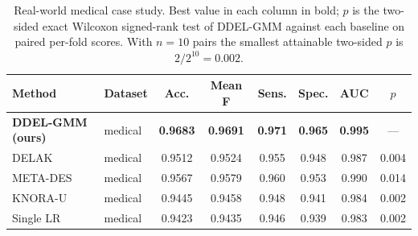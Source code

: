\begin{table}[htbp]
	\begin{center}
		\caption{Real-world medical case study. Best value in each column in bold; $p$ is the two-sided exact Wilcoxon signed-rank test of DDEL-GMM against each baseline on paired per-fold scores. With $n=10$ pairs the smallest attainable two-sided $p$ is $2/2^{10}=0.002$.}
		\label{tab:case_study}
		\begin{tabular}{|l|l|c|c|c|c|c|c|}
			\hline
			\textbf{Method} & \textbf{Dataset} & \textbf{Acc.} & \textbf{Mean F} & \textbf{Sens.} & \textbf{Spec.} & \textbf{AUC} & \textbf{$p$} \\
			\hline
			\textbf{DDEL-GMM (ours)} & medical & \textbf{0.9683} & \textbf{0.9691} & \textbf{0.971} & \textbf{0.965} & \textbf{0.995} & --- \\
			DELAK & medical & 0.9512 & 0.9524 & 0.955 & 0.948 & 0.987 & 0.004 \\
			META-DES & medical & 0.9567 & 0.9579 & 0.960 & 0.953 & 0.990 & 0.014 \\
			KNORA-U & medical & 0.9445 & 0.9458 & 0.948 & 0.941 & 0.984 & 0.002 \\
			Single LR & medical & 0.9423 & 0.9435 & 0.946 & 0.939 & 0.983 & 0.002 \\
			\hline
		\end{tabular}
	\end{center}
\end{table}
